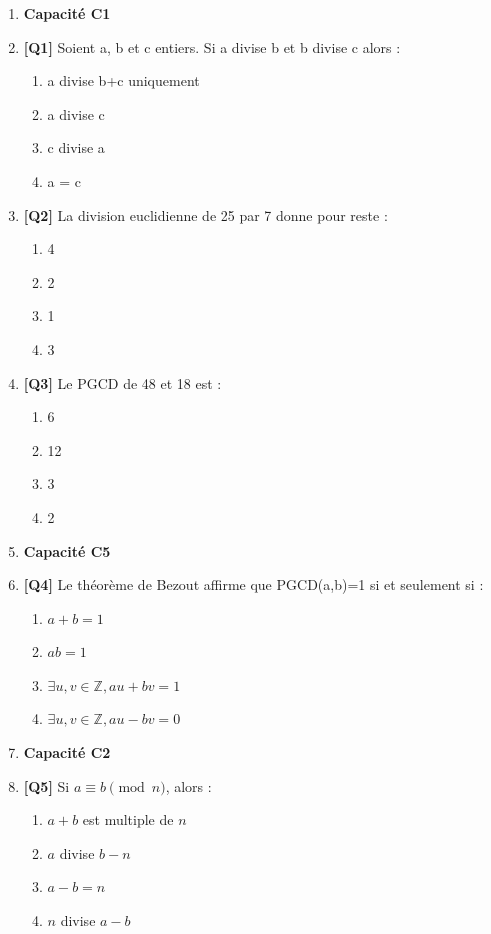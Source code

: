 \begin{enumerate}

\item[] \textbf{Capacité C1}

\item \textbf{[Q1]} Soient a, b et c entiers. Si a divise b et b divise c alors :
  \begin{enumerate}[label=\Alph*.]
    \item a divise b+c uniquement
    \item a divise c
    \item c divise a
    \item a = c
  \end{enumerate}

\item \textbf{[Q2]} La division euclidienne de 25 par 7 donne pour reste :
  \begin{enumerate}[label=\Alph*.]
    \item 4
    \item 2
    \item 1
    \item 3
  \end{enumerate}

\item \textbf{[Q3]} Le PGCD de 48 et 18 est :
  \begin{enumerate}[label=\Alph*.]
    \item 6
    \item 12
    \item 3
    \item 2
  \end{enumerate}

\item[] \textbf{Capacité C5}

\item \textbf{[Q4]} Le théorème de Bezout affirme que PGCD(a,b)=1 si et seulement si :
  \begin{enumerate}[label=\Alph*.]
    \item $a+b=1$
    \item $a b = 1$
    \item $\exists u,v \in \mathbb{Z}, au+bv=1$
    \item $\exists u,v \in \mathbb{Z}, au-bv=0$
  \end{enumerate}

\item[] \textbf{Capacité C2}

\item \textbf{[Q5]} Si $a \equiv b \pmod{n}$, alors :
  \begin{enumerate}[label=\Alph*.]
    \item $a+b$ est multiple de $n$
    \item $a$ divise $b-n$
    \item $a-b = n$
    \item $n$ divise $a-b$
  \end{enumerate}


\end{enumerate}
